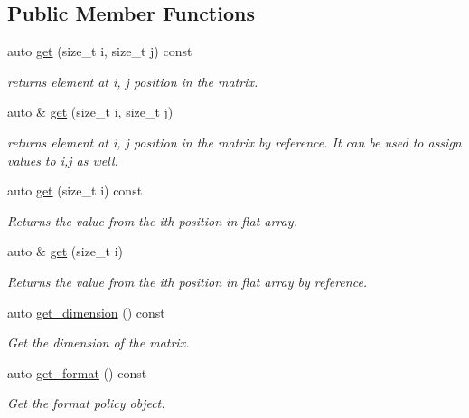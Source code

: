 \subsection*{Public Member Functions}
\begin{DoxyCompactItemize}
\item 
auto \mbox{\hyperlink{classtest_1_1matrix_a29885efc9b15c38610a6595f5aa18c19}{get}} (size\+\_\+t i, size\+\_\+t j) const
\begin{DoxyCompactList}\small\item\em returns element at i, j position in the matrix. \end{DoxyCompactList}\item 
auto \& \mbox{\hyperlink{classtest_1_1matrix_ad101d663d9026d4a09aeae44350f4842}{get}} (size\+\_\+t i, size\+\_\+t j)
\begin{DoxyCompactList}\small\item\em returns element at i, j position in the matrix by reference. It can be used to assign values to i,j as well. \end{DoxyCompactList}\item 
auto \mbox{\hyperlink{classtest_1_1matrix_a30b5e83cc4d03d78c9df3b9aea4808fd}{get}} (size\+\_\+t i) const
\begin{DoxyCompactList}\small\item\em Returns the value from the ith position in flat array. \end{DoxyCompactList}\item 
auto \& \mbox{\hyperlink{classtest_1_1matrix_ae97c6a005660b4a3b3d231d913527a9e}{get}} (size\+\_\+t i)
\begin{DoxyCompactList}\small\item\em Returns the value from the ith position in flat array by reference. \end{DoxyCompactList}\item 
auto \mbox{\hyperlink{classtest_1_1matrix_ad441a590a304dabb40950e5dfaee698a}{get\+\_\+dimension}} () const
\begin{DoxyCompactList}\small\item\em Get the dimension of the matrix. \end{DoxyCompactList}\item 
auto \mbox{\hyperlink{classtest_1_1matrix_a8ae828048f36dc401ec79755c782a204}{get\+\_\+format}} () const
\begin{DoxyCompactList}\small\item\em Get the format policy object. \end{DoxyCompactList}\item 

\end{DoxyCompactItemize}
